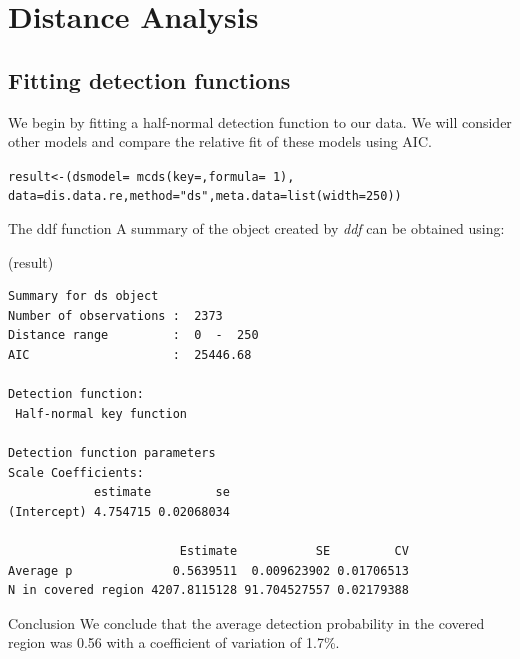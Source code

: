 

\section{Distance Analysis}
\subsection{Fitting detection functions}
\label{ss:fittingdetectionfunctions}
We begin by fitting a half-normal detection function to our data. We will consider other models and compare the relative fit of these models using AIC. 
\begin{knitrout}\footnotesize
{}\color{fgcolor}
\begin{kframe}
\begin{alltt}
result <- (dsmodel=~mcds(key=, formula=~1), 
     data = dis.data.re, method="ds", meta.data=list(width=250))
\end{alltt}
\end{kframe}
\end{knitrout}
\begin{block}{The ddf function}
A summary of the object created by \textit{ddf} can be obtained using: 
\end{block}
\begin{knitrout}\scriptsize
{}\color{fgcolor}
\begin{kframe}
\noindent
{}(result)
\begin{verbatim}
Summary for ds object 
Number of observations :  2373 
Distance range         :  0  -  250 
AIC                    :  25446.68 

Detection function:
 Half-normal key function 

Detection function parameters 
Scale Coefficients:  
            estimate         se
(Intercept) 4.754715 0.02068034

                        Estimate           SE         CV
Average p              0.5639511  0.009623902 0.01706513
N in covered region 4207.8115128 91.704527557 0.02179388
\end{verbatim}
\end{kframe}
\end{knitrout}
\begin{block}{Conclusion}
We conclude that the average detection probability in the covered region was 0.56 with a coefficient of variation of 1.7\%. 
\end{block}

